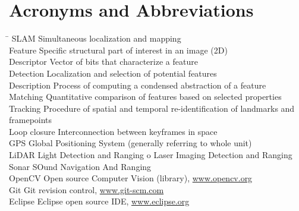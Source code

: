 \section*{Acronyms and Abbreviations}
\label{sec:acronyms}
\begin{tabbing}
	\hspace*{3.5cm}		\= \kill
	SLAM \> Simultaneous localization and mapping \\[1ex]
	Feature \> Specific structural part of interest in an image (2D) \\[1ex]
	Descriptor \> Vector of bits that characterize a feature \\[1ex]
	Detection \> Localization and selection of potential features \\[1ex]
	Description \> Process of computing a condensed abstraction of a feature \\[1ex]
	Matching \> Quantitative comparison of features based on selected properties \\[1ex]
	Tracking \> Procedure of spatial and temporal re-identification of landmarks and framepoints \\[1ex]
	Loop closure \> Interconnection between keyframes in space \\[1ex]
	GPS \> Global Positioning System (generally referring to whole unit) \\[1ex]
    LiDAR \> Light Detection and Ranging o Laser Imaging Detection and Ranging \\[1ex]
    Sonar \> SOund Navigation And Ranging \\[1ex]
	OpenCV  \> Open source Computer Vision (library), \url{www.opencv.org} \\[1ex]
	Git  \> Git revision control, \url{www.git-scm.com} \\[1ex]
	Eclipse \> Eclipse open source IDE, \url{www.eclipse.org}
\end{tabbing}